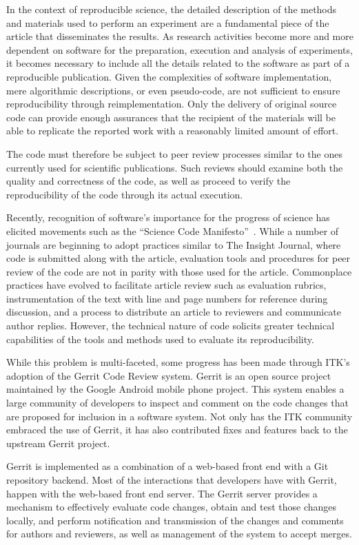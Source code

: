 \documentclass{frontiersENG} %
\begin{document}
In the context of reproducible science, the detailed description of the methods
and materials used to perform an experiment are a fundamental piece of the
article that disseminates the results. As research activities become more and
more dependent on software for the preparation, execution and analysis of
experiments, it becomes necessary to include all the details related to the
software as part of a reproducible publication. Given the complexities of
software implementation, mere algorithmic descriptions, or even pseudo-code,
are not sufficient to ensure reproducibility through reimplementation. Only the
delivery of original source code can provide enough assurances that the
recipient of the materials will be able to replicate the reported work with a
reasonably limited amount of effort.

The code must therefore be subject to peer review processes similar to the ones
currently used for scientific publications. Such reviews should examine both
the quality and correctness of the code, as well as proceed to verify the
reproducibility of the code through its actual execution.

Recently, recognition of software's importance for the progress of science has
elicited movements such as the ``Science Code Manifesto''~\cite{Barnes2011}.
While a number of journals are beginning to adopt practices similar to The
Insight Journal, where code is submitted along with the article, evaluation
tools and procedures for peer review of the code are not in parity with those
used for the article. Commonplace practices have evolved to facilitate article
review such as evaluation rubrics, instrumentation of the text with line and
page numbers for reference during discussion, and a process to distribute an
article to reviewers and communicate author replies. However, the technical
nature of code solicits greater technical capabilities of the tools and
methods used to evaluate its reproducibility.

While this problem is multi-faceted, some progress has been made through ITK$’$s
adoption of the Gerrit Code Review system.  Gerrit is an open source project
maintained by the Google Android mobile phone project. This system enables a
large community of developers to inspect and comment on the code changes that
are proposed for inclusion in a software system. Not only has the ITK community
embraced the use of Gerrit, it has also contributed fixes and features back to
the upstream Gerrit project.

Gerrit is implemented as a combination of a web-based front end with a Git
repository backend. Most of the interactions that developers have with Gerrit,
happen with the web-based front end server. The Gerrit server provides a
mechanism to effectively evaluate code changes, obtain and test those changes
locally, and perform notification and transmission of the changes and comments
for authors and reviewers, as well as management of the system to accept
merges.
\end{document}
